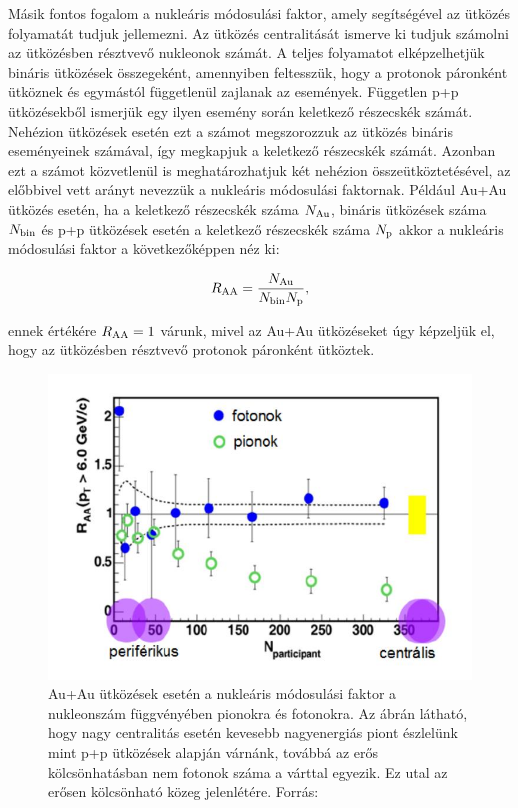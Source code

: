 \documentclass[10pt,a4paper]{article}
\numberwithin{equation}{subsection}
\numberwithin{figure}{section}
\begin{document}
Másik fontos fogalom a nukleáris módosulási faktor, amely segítségével az ütközés folyamatát tudjuk jellemezni. Az ütközés centralitását ismerve ki tudjuk számolni az ütközésben résztvevő nukleonok számát. A teljes folyamatot elképzelhetjük bináris ütközések összegeként, amennyiben feltesszük, hogy a protonok páronként ütköznek és egymástól függetlenül zajlanak az események. Független p+p ütközésekből ismerjük egy ilyen esemény során keletkező részecskék számát. Nehézion ütközések esetén ezt a számot megszorozzuk az ütközés bináris eseményeinek számával, így megkapjuk a keletkező részecskék számát. Azonban ezt a számot közvetlenül is meghatározhatjuk két nehézion összeütköztetésével, az előbbivel vett arányt nevezzük a nukleáris módosulási faktornak. Például Au+Au ütközés esetén, ha a keletkező részecskék száma $N_{{\rm Au}}$, bináris ütközések száma $N_{{\rm bin}}$ és p+p ütközések esetén a keletkező részecskék száma $N_{{\rm p}}$ akkor a nukleáris módosulási faktor a következőképpen néz ki:
\begin{large}
\begin{equation}
R_{\rm AA}=\frac{N_{\rm Au}}{N_{\rm bin}N_{\rm p}},
\label{eq:e1}
\end{equation}
\end{large}
ennek értékére  $R_{\rm AA}=1$ várunk, mivel az Au+Au ütközéseket úgy képzeljük el, hogy az ütközésben résztvevő protonok páronként ütköztek.  

\begin{center}
\begin{figure}[H]
\centering
\includegraphics[scale=0.6]{pic/int/p1}
 \caption{Au+Au ütközések esetén a nukleáris módosulási faktor a nukleonszám függvényében pionokra és fotonokra. Az ábrán látható, hogy nagy centralitás esetén kevesebb nagyenergiás piont észlelünk mint p+p ütközések alapján várnánk, továbbá az erős kölcsönhatásban nem 
  fotonok száma a várttal egyezik. Ez utal az erősen kölcsönható közeg jelenlétére. Forrás: ~\cite{CsanadHabil}}
\label{fig:mmf}
\end{figure}
\end{center}
\end{document}
